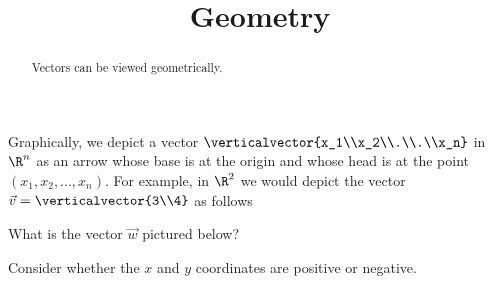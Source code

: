 \documentclass{ximera}
\title{Geometry}
\begin{document}
\begin{abstract}
  Vectors can be viewed geometrically.
\end{abstract}
\maketitle


Graphically, we depict a vector $\verticalvector{x_1\\x_2\\.\\.\\x_n}$
in $\R^n$ as an arrow whose base is at the origin and whose head is at
the point $(x_1,x_2,...,x_n)$.  For example, in $\R^2$ we would depict
the vector $\vec{v} = \verticalvector{3\\4}$ as follows

\begin{center}
\end{center}

\begin{question}
  What is the vector $\vec{w}$ pictured below?

\begin{center}
\end{center}

  \begin{solution}
    \begin{hint}
      Consider whether the $x$ and $y$ coordinates are positive or negative.
    \end{hint}
    \begin{multiple-choice}
    \end{multiple-choice}
  \end{solution}
\end{question}
  	 
\end{document}
